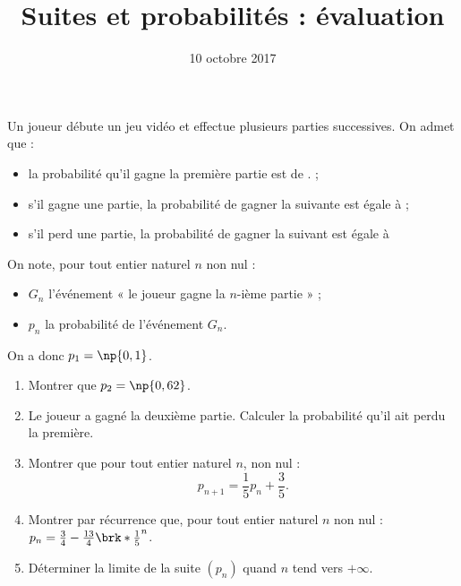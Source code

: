 \documentclass[12pt,french,a4paper]{article}
\title{Suites et probabilités : évaluation \no{2} }
\date{10 octobre 2017}
\author{}
\begin{document}
\maketitle
\thispagestyle{fancy}

\begin{center}

\end{center}

\begin{question}
  Un joueur débute un jeu vidéo et effectue plusieurs parties successives.
  On admet que :
  \begin{itemize}
    \item la probabilité qu'il gagne la première partie est de . ;
    \item s'il gagne une partie, la probabilité de gagner la suivante est
      égale à  ;
    \item s'il perd une partie, la probabilité de gagner la suivant est
      égale à 
  \end{itemize}
  On note, pour tout entier naturel $n$ non nul :
  \begin{itemize}
    \item $G_n$ l'événement « le joueur gagne la $n$-ième partie » ;
    \item $p_n$ la probabilité de l'événement $G_n$.
  \end{itemize}
  On a donc $p_1 = \np{0,1}$.
  \begin{enumerate}
    \item Montrer que $p_2 = \np{0,62}$.
    \item Le joueur a gagné la deuxième partie. Calculer la probabilité
      qu'il ait perdu la première.
    \item Montrer que pour tout entier naturel $n$, non nul : \[ p_{n+1} =
      \frac15 p_n + \frac35 . \]
    \item Montrer par récurrence que, pour tout entier naturel $n$ non nul :
      $ p_n = \frac34 - \frac{13}4 \brk*{\frac15}^n$.
    \item Déterminer la limite de la suite $(p_n)$ quand $n$ tend vers
      $+\infty$.
  \end{enumerate}
\end{question}
\end{document}
